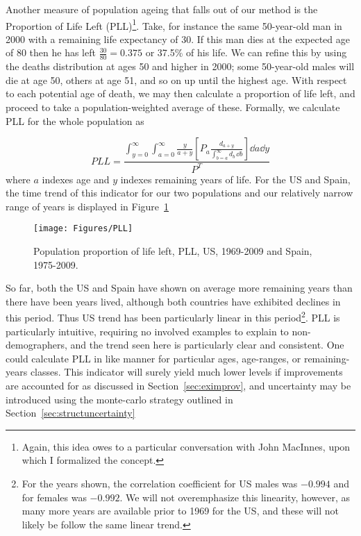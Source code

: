 Another measure of population ageing that falls out of our method is the
Proportion of Life Left (PLL)\footnote{Again, this idea owes to a
particular conversation with John MacInnes, upon which I formalized the
concept.}. Take, for instance the same 50-year-old man in 2000 with a remaining life expectancy of
30. If this man dies at the expected age of 80 then he has left $\tfrac{30}{80}
= 0.375$ or 37.5\% of his life. We can refine this by using the deaths 
distribution at ages 50 and higher in 2000; some 50-year-old
males will die at age 50, others at age 51, and so on up until the highest age.
With respect to each potential age of death, we may then calculate a proportion
of life left, and proceed to take a population-weighted average of these.
Formally, we calculate PLL for the whole population as

\begin{equation}
PLL = \frac{\int _{y = 0} ^\infty \int _{a = 0} ^\infty \frac{y}{a + y}
\left[ P_a
\frac{d_{a + y} }{ \int _{b = a} ^{\infty} d_b\, \dd b  }\right] \dd a \dd y }{
P^T }
\end{equation}
where $a$ indexes age and $y$ indexes remaining years of life. For the US and
Spain, the time trend of this indicator for our two populations and our
relatively narrow range of years is displayed in Figure~\ref{fig:PLL}
\begin{figure}
      \centering
      \caption{Population proportion of life left, PLL, US, 1969-2009 and
      Spain, 1975-2009.}
         \texttt{[image: Figures/PLL]}
      \label{fig:PLL} 
\end{figure}

So far, both the US and Spain have shown on average more remaining years than
there have been years lived, although both countries have exhibited declines in
this period. Thus US trend has been particularly linear in this
period\footnote{For the years shown, the correlation coefficient for US males
was $-0.994$ and for females was $-0.992$. We will not overemphasize this
linearity, however, as many more years are available prior to 1969 for the US,
and these will not likely be follow the same linear trend.}. PLL is particularly
intuitive, requiring no involved examples to explain to non-demographers, and the trend seen here is particularly clear and consistent. One could calculate PLL in like manner for particular ages, age-ranges, or remaining-years classes. This indicator will surely yield much lower levels if improvements are accounted for as discussed in Section~\ref{sec:eximprov}, and uncertainty may be introduced using the monte-carlo strategy outlined in Section~\ref{sec:structuncertainty}

